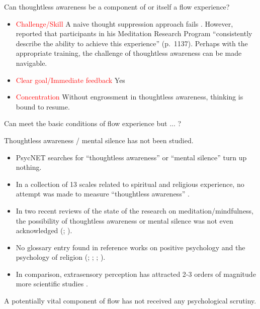 \documentclass[10pt,utf8x]{beamer}
\begin{document}
\begin{frame}
Can thoughtless awareness be a component of or itself a flow experience? 

\begin{itemize}
\item \textcolor{red}{Challenge/Skill} A naive thought suppression approach fails \cite{wegner2003}.
However,  reported that participants in his
Meditation Research Program ``consistently describe the
ability to achieve this experience'' (p.~1137).
Perhaps with the appropriate training,
the challenge of thoughtless awareness can be made navigable.

\item \textcolor{red}{Clear goal/Immediate feedback} Yes

\item \textcolor{red}{Concentration} Without engrossment
in thoughtless awareness, thinking is bound to resume.

\end{itemize}

Can meet the basic conditions of flow experience but ... ?
\end{frame}

\begin{frame}
Thoughtless awareness / mental silence has not been studied.

\begin{itemize}
\item PsycNET searches for ``thoughtless awareness'' or ``mental silence''
turn up nothing.
\item
In a collection of 13 scales related to spiritual and religious experience,
no attempt was made to measure ``thoughtless awareness'' \cite{fetzer1999}.
\item
In two recent reviews of the state of the research on meditation/mindfulness,
the possibility of thoughtless awareness or mental silence was not
even acknowledged (; ).
\item
No glossary entry found in reference works on
positive psychology and the psychology of religion
(; ; ; ).
\item In comparison, extrasensory perception has attracted 2-3 orders of
magnitude more scientific studies \cite{lau2004}.
\end{itemize}

A potentially vital component of flow has not received
 any psychological scrutiny.
\end{frame}
\end{document}
